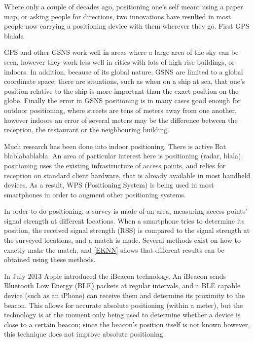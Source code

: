 Where only a couple of decades ago, positioning one's self meant using a paper map, or asking people for directions, two innovations have resulted in most people now carrying a positioning device with them wherever they go.
First GPS  blalala


GPS and other GSNS work well in areas where a large area of the sky can be seen, however they work less well in cities with lots of high rise buildings, or indoors.
In addition, because of its global nature, GSNS are limited to a global coordinate space; there are situations, such as when on a ship at sea, that one's position relative to the ship is more important than the exact position on the globe.
Finally the error in GSNS positioning is in many cases good enough for outdoor positioning, where streets are tens of meters away from one another, however indoors an error of several meters may be the difference between the reception, the restaurant or the neighbouring building.

Much research has been done into indoor positioning. There is active Bat blablabablabla.
An area of particular interest here is \wifi positioning (radar, blala).
\Wifi positioning uses the existing infrastructure of \wifi access points, and relies for reception on standard \wifi client hardware, that is already available in most handheld devices.
As a result, WPS (\Wifi Positioning System) is being used in most smartphones in order to augment other positioning systems.

In order to do \wifi positioning, a survey is made of an area, measuring \wifi access points' signal strength at different locations.
When a smartphone tries to determine its position, the received signal strength (RSS) is compared to the signal strength at the surveyed locations, and a match is made.
Several methods exist on how to exactly make the match, and \ref{EKNN} shows that different results can be obtained using these methods.



In July 2013 Apple introduced the iBeacon technology.
An iBeacon sends Bluetooth Low Energy (BLE) packets at regular intervals, and a BLE capable device (such as an iPhone) can receive them and determine its proximity to the beacon.
This allows for accurate absolute positioning (within a meter), but the technology is at the moment only being used to determine whether a device is close to a certain beacon; since the beacon's position itself is not known however, this technique does not improve absolute positioning.






